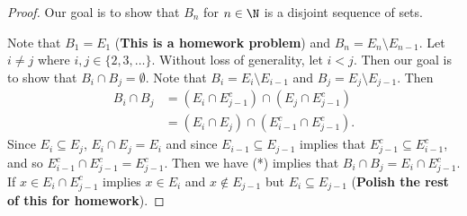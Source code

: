 \begin{proof}
Our goal is to show that \( {B}_{n} \) for \( n \in \N  \) is a disjoint sequence of sets. 

Note that \( {B}_{1} = {E}_{1} \) (\textbf{This is a homework problem}) and \( {B}_{n} = {E}_{n} \setminus  {E}_{n-1} \). Let \( i \neq j  \) where \( i,j \in \{  2,3,\dots \}  \). Without loss of generality, let \( i < j  \). Then our goal is to show that \( {B}_{i} \cap {B}_{j} = \emptyset \). Note that \( {B}_{i} = {E}_{i} \setminus  {E}_{i-1} \) and \( {B}_{j} = {E}_{j} \setminus  {E}_{j-1} \).  Then 
\begin{align*}
{B}_{i} \cap {B}_{j} &= ({E}_{i} \cap {E}_{j-1}^{c} ) \cap  ({E}_{j} \cap {E}_{j-1}^{c}) \\ 
                     &= ({E}_{i} \cap {E}_{j}) \cap ({E}_{i-1}^{c} \cap {E}_{j-1}^{c}). \tag{*}
\end{align*}
Since \( {E}_{i} \subseteq  {E}_{j} \), \( {E}_{i} \cap {E}_{j} = {E}_{i} \) and since \( {E}_{i-1} \subseteq {E}_{j-1}    \) implies that \( {E}_{j-1}^{c} \subseteq  {E}_{i-1}^{c}\), and so \( {E}_{i-1}^{c} \cap {E}_{j-1}^{c} = {E}_{j-1}^{c} \). Then we have (*) implies that \( {B}_{i} \cap  {B}_{j} =   {E}_{i} \cap {E}_{j-1}^{c} \). If \( x \in {E}_{i} \cap {E}_{j-1}^{c} \) implies \( x \in {E}_{i} \) and \( x \notin {E}_{j-1} \) but \( {E}_{i} \subseteq  {E}_{j-1} \) (\textbf{Polish the rest of this for homework}). 

\end{proof}

\begin{prop}
    
\end{prop}


